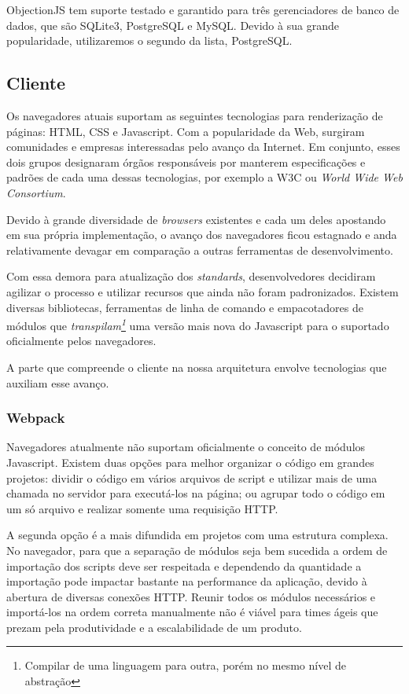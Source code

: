 ObjectionJS tem suporte testado e garantido para três gerenciadores de banco de dados, que são SQLite3, PostgreSQL e MySQL. Devido à sua grande popularidade, utilizaremos o segundo da lista, PostgreSQL.

\subsection{Cliente}

Os navegadores atuais suportam as seguintes tecnologias para renderização de páginas: HTML, CSS e Javascript. Com a popularidade da Web, surgiram comunidades e empresas interessadas pelo avanço da Internet. Em conjunto, esses dois grupos designaram órgãos responsáveis por manterem especificações e padrões de cada uma dessas tecnologias, por exemplo a W3C ou \textit{World Wide Web Consortium}.

Devido à grande diversidade de \textit{browsers} existentes e cada um deles apostando em sua própria implementação, o avanço dos navegadores ficou estagnado e anda relativamente devagar em comparação a outras ferramentas de desenvolvimento.

Com essa demora para atualização dos \textit{standards}, desenvolvedores decidiram agilizar o processo e utilizar recursos que ainda não foram padronizados. Existem diversas bibliotecas, ferramentas de linha de comando e empacotadores de módulos que \textit{transpilam\footnote{Compilar de uma linguagem para outra, porém no mesmo nível de abstração}} uma versão mais nova do Javascript para o suportado oficialmente pelos navegadores.

A parte que compreende o cliente na nossa arquitetura envolve tecnologias que auxiliam esse avanço.

\subsubsection{Webpack}

Navegadores atualmente não suportam oficialmente o conceito de módulos Javascript. Existem duas opções para melhor organizar o código em grandes projetos: dividir o código em vários arquivos de script e utilizar mais de uma chamada no servidor para executá-los na página; ou agrupar todo o código em um só arquivo e realizar somente uma requisição HTTP.

A segunda opção é a mais difundida em projetos com uma estrutura complexa. No navegador, para que a separação de módulos seja bem sucedida a ordem de importação dos scripts deve ser respeitada e dependendo da quantidade a importação pode impactar bastante na performance da aplicação, devido à abertura de diversas conexões HTTP. Reunir todos os módulos necessários e importá-los na ordem correta manualmente não é viável para times ágeis que prezam pela produtividade e a escalabilidade de um produto.

